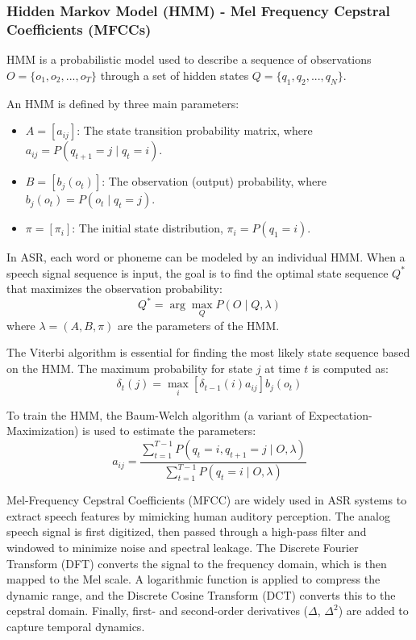 \documentclass[conference]{IEEEtran}
\begin{document}
\subsubsection{Hidden Markov Model (HMM) - Mel Frequency Cepstral Coefficients (MFCCs)}
HMM is a probabilistic model used to describe a sequence of observations $O = \{o_1, o_2, ..., o_T\}$ through a set of hidden states $Q = \{q_1, q_2, ..., q_N\}$.

An HMM is defined by three main parameters:
\begin{itemize}
    \item $A = [a_{ij}]$: The state transition probability matrix, where $a_{ij} = P(q_{t+1} = j \mid q_t = i)$.
    \item $B = [b_j(o_t)]$: The observation (output) probability, where $b_j(o_t) = P(o_t \mid q_t = j)$.
    \item $\pi = [\pi_i]$: The initial state distribution, $\pi_i = P(q_1 = i)$.
\end{itemize}

In ASR, each word or phoneme can be modeled by an individual HMM. When a speech signal sequence is input, the goal is to find the optimal state sequence $Q^*$ that maximizes the observation probability:
\begin{equation}
    Q^* = \arg\max_Q P(O \mid Q, \lambda)
\end{equation}
where $\lambda = (A, B, \pi)$ are the parameters of the HMM.

The Viterbi algorithm is essential for finding the most likely state sequence based on the HMM. The maximum probability for state $j$ at time $t$ is computed as:
\begin{equation}
    \delta_t(j) = \max_i \left[ \delta_{t-1}(i) a_{ij} \right] b_j(o_t)
\end{equation}

To train the HMM, the Baum-Welch algorithm (a variant of Expectation-Maximization) is used to estimate the parameters:
\begin{equation}
    a_{ij} = \frac{\sum_{t=1}^{T-1} P(q_t = i, q_{t+1} = j \mid O, \lambda)}{\sum_{t=1}^{T-1} P(q_t = i \mid O, \lambda)}
\end{equation}

Mel-Frequency Cepstral Coefficients (MFCC) are widely used in ASR systems to extract speech features by mimicking human auditory perception. The analog speech signal is first digitized, then passed through a high-pass filter and windowed to minimize noise and spectral leakage. The Discrete Fourier Transform (DFT) converts the signal to the frequency domain, which is then mapped to the Mel scale. A logarithmic function is applied to compress the dynamic range, and the Discrete Cosine Transform (DCT) converts this to the cepstral domain. Finally, first- and second-order derivatives ($\Delta$, $\Delta^2$) are added to capture temporal dynamics.
\end{document}
